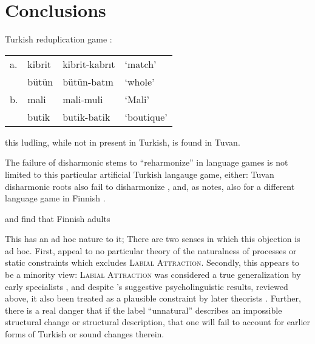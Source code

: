 \section{Conclusions}

\citet{Harrison2001}

\ex Turkish reduplication game \citep[][231]{Harrison2001}: \\
\begin{tabular}{l l l l}
a. & kibrit & kibrit-kabrıt & `match'    \\
   & bütün  & bütün-batın   & `whole'    \\
b. & mali   & mali-muli     & `Mali'     \\
   & butik  & butik-batik   & `boutique' \\
\end{tabular} \xe

this ludling, while not in present in Turkish, is found in Tuvan.

The failure of disharmonic stems to ``reharmonize'' in language games is not limited to this particular artificial Turkish langauge game, either: Tuvan disharmonic roots also fail to disharmonize \citep{Harrison2001}, and, as \citeauthor{Harrison2001} notes, also for a different language game in Finnish \citep{Campbell1986}. 

\citet{Suomi1997} and \citet{Vroomen1998} find that Finnish adults

\citet{Kabak2010} %

\citet{Kampen2008} %




\citet{Becker2011}

This has an ad hoc nature to it; 
There are two senses in which this objection is ad hoc. 
First, \citeauthor{Becker2011} appeal to no particular theory of the naturalness of processes or static constraints which excludes \textsc{Labial Attraction}. 
Secondly, this appears to be a minority view: \textsc{Labial Attraction} was considered a true generalization by early specialists
\citep[e.g.,][]{Lees1966a}, and despite \citeauthor{Zimmer1969}'s suggestive psycholinguistic results, reviewed above, it also been treated as a plausible constraint by later theorists \citep[e.g.,][]{NiChiosain1993,Ito1993,Ito1995a,Zuraw2000}.
Further, there is a real danger that if the label ``unnatural'' 
describes an impossible structural change or structural description, that one will fail to account for earlier forms of Turkish or sound changes therein.

